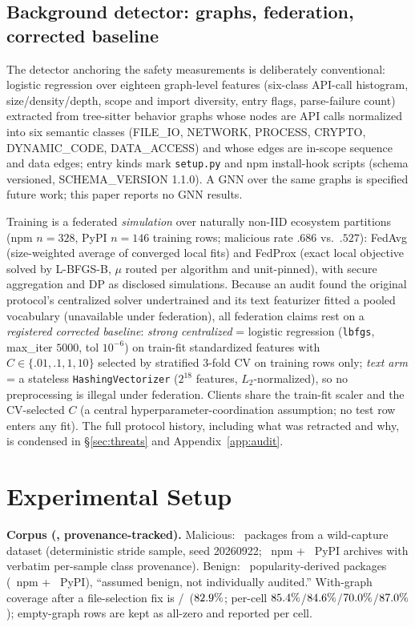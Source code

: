 \documentclass[sigconf,nonacm]{acmart}
\begin{document}
\subsection{Background detector: graphs, federation, corrected
baseline}\label{sec:detector-design}
The detector anchoring the safety measurements is deliberately
conventional: logistic regression over eighteen graph-level features
(six-class API-call histogram, size/density/depth, scope and import
diversity, entry flags, parse-failure count) extracted from tree-sitter
behavior graphs whose nodes are API calls normalized into six semantic
classes (FILE\_IO, NETWORK, PROCESS, CRYPTO, DYNAMIC\_CODE, DATA\_ACCESS)
and whose edges are in-scope sequence and data edges; entry kinds mark
\texttt{setup.py} and npm install-hook scripts (schema versioned,
SCHEMA\_VERSION 1.1.0). A GNN over the same graphs is specified future
work; this paper reports no GNN results.

Training is a federated \emph{simulation} over naturally non-IID
ecosystem partitions (npm $n{=}328$, PyPI $n{=}146$ training rows;
malicious rate $.686$ vs.\ $.527$): FedAvg (size-weighted average of
converged local fits) and FedProx (exact local objective solved by
L-BFGS-B, $\mu$ routed per algorithm and unit-pinned), with secure
aggregation and DP as disclosed simulations. Because an audit found the
original protocol's centralized solver undertrained and its text
featurizer fitted a pooled vocabulary (unavailable under federation), all
federation claims rest on a \emph{registered corrected baseline}:
\emph{strong centralized} = logistic regression (\texttt{lbfgs},
max\_iter $5000$, tol $10^{-6}$) on train-fit standardized features with
$C\in\{.01,.1,1,10\}$ selected by stratified 3-fold CV on training rows
only; \emph{text arm} = a stateless \texttt{HashingVectorizer} ($2^{18}$
features, $L_2$-normalized), so no preprocessing is illegal under
federation. Clients share the train-fit scaler and the CV-selected $C$ (a
central hyperparameter-coordination assumption; no test row enters any
fit). The full protocol history, including what was retracted and why, is
condensed in \S\ref{sec:threats} and Appendix~\ref{app:audit}.

\section{Experimental Setup}\label{sec:setup}
\textbf{Corpus (\pmCorpusTotal, provenance-tracked).} Malicious:
\pmCorpusMal\ packages from a wild-capture dataset (deterministic stride
sample, seed 20260922; \pmCorpusNpmMal\ npm + \pmCorpusPypiMal\ PyPI
archives with verbatim per-sample class provenance). Benign:
\pmCorpusBen\ popularity-derived packages (\pmCorpusNpmBen\ npm +
\pmCorpusPypiBen\ PyPI), ``assumed benign, not individually audited.''
With-graph coverage after a file-selection fix is
\pmCovTotalNum/\pmCovTotalDen\ ($82.9\%$; per-cell
$85.4\%$/$84.6\%$/$70.0\%$/$87.0\%$);
empty-graph rows are kept as all-zero and reported per cell.
\end{document}
